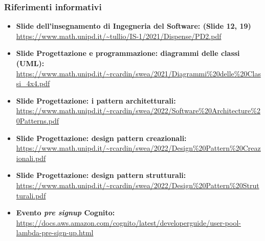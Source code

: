 \subsubsection{Riferimenti informativi}
\aCapo{} 
\begin{itemize}
	\item 
    {\textbf{Slide dell'insegnamento di Ingegneria del Software: (Slide 12, 19)}}\\\url{https://www.math.unipd.it/~tullio/IS-1/2021/Dispense/PD2.pdf}
	\item
	{\textbf{Slide Progettazione e programmazione: diagrammi delle classi (UML):}}\\\url{https://www.math.unipd.it/~rcardin/swea/2021/Diagrammi%20delle%20Classi_4x4.pdf}
	\item
	{\textbf{Slide Progettazione: i pattern architetturali:}}\\\url{https://www.math.unipd.it/~rcardin/swea/2022/Software%20Architecture%20Patterns.pdf}
	\item 
	{\textbf{Slide Progettazione: design pattern creazionali:}}\\\url{https://www.math.unipd.it/~rcardin/swea/2022/Design%20Pattern%20Creazionali.pdf}
	\item 
	{\textbf{Slide Progettazione: design pattern strutturali:}}\\\url{https://www.math.unipd.it/~rcardin/swea/2022/Design%20Pattern%20Strutturali.pdf}
	\item 
	{\textbf{Evento \textit{pre signup} Cognito:}}\\\url{https://docs.aws.amazon.com/cognito/latest/developerguide/user-pool-lambda-pre-sign-up.html}
\end{itemize}
